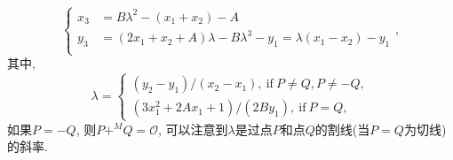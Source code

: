 \begin{equation*}
\left\{
\begin{array}{ll}
x_3 & = B\lambda^2 - (x_1 + x_2) - A\\
y_3 & = (2x_1 + x_2 + A)\lambda - B\lambda^3 - y_1 = \lambda(x_1 - x_2) - y_1\\
\end{array},
\right.
\end{equation*}
其中,
\begin{equation*}
\lambda = 
\left\{
\begin{array}{ll}
(y_2-y_1) / (x_2-x_1),\ \text{if}\ P\neq Q, P \neq -Q,\\
(3x_1^2 + 2Ax_1 + 1) / (2By_1),\ \text{if}\ P = Q,
\end{array}
\right.
\end{equation*}
如果$P=-Q$, 则$P +^M Q = \mathcal{O}$, 
可以注意到$\lambda$是过点$P$和点$Q$的割线(当$P=Q$为切线)的斜率.

